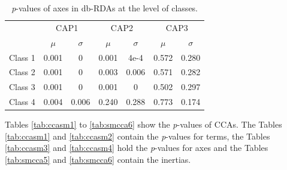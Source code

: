 		    \begin{table}[h!] 
		    
				\small
				\caption{\textit{p}-values of axes in db-RDAs at the level of classes.}
				\centering
				
				\begin{tabular}{@{}lcccccc@{}}
					
					\toprule
					& \multicolumn{2}{c}{CAP1} & \multicolumn{2}{c}{CAP2} & \multicolumn{2}{c}{CAP3}\\\cmidrule(l){2-3} \cmidrule(l){4-5} \cmidrule(l){6-7}
					& $\mu$ & $\sigma$ & $\mu$ & $\sigma$ & $\mu$ & $\sigma$\\
					\hline
					Class 1 & 0.001 & 0 & 0.001 & 4e-4 & 0.572 & 0.280\\
					Class 2 & 0.001 & 0 & 0.003 & 0.006 & 0.571 & 0.282\\
					Class 3 & 0.001 & 0 & 0.001 & 0 & 0.502 & 0.297\\
					Class 4 & 0.004 & 0.006 & 0.240 & 0.288 & 0.773 & 0.174\\
					\toprule
					
				\end{tabular}
			
				\label{tab:dbsm4}
			
			\end{table}
		  	\vspace{10em}
		  	

		 Tables \ref{tab:ccasm1} to \ref{tab:smcca6} show the \textit{p}-values of CCAs. 
		  The Tables \ref{tab:ccasm1} and \ref{tab:ccasm2} contain the \textit{p}-values for terms, the Tables \ref{tab:ccasm3} and \ref{tab:ccasm4} hold the \textit{p}-values for axes and the Tables \ref{tab:smcca5} and \ref{tab:smcca6} contain the inertias. 
		  \vspace{5em}  
		  
		
